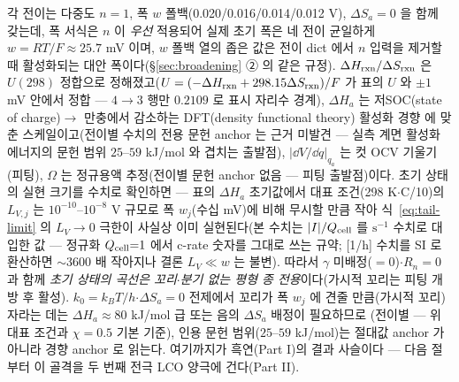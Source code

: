 각 전이는 다중도 $n=1$, 폭 $w$ 폴백(0.020/0.016/0.014/0.012 V), $\Delta S_a=0$ 을 함께 갖는데, 폭
서식은 $n$ 이 \emph{우선} 적용되어 실제 초기 폭은 네 전이 균일하게 $w=RT/F\approx25.7$ mV 이며, $w$
폴백 열의 좁은 값은 전이 dict 에서 $n$ 입력을 제거할 때 활성화되는 대안 폭이다(\S\ref{sec:broadening}
② 의 같은 규정). $\Delta H_{\mathrm{rxn}}/\Delta S_{\mathrm{rxn}}$
은 $U(298)$ 정합으로 정해졌고($U=(-\Delta H_{\mathrm{rxn}}+298.15\Delta S_{\mathrm{rxn}})/F$ 가 표의 $U$ 와 $\pm1$ mV 안에서 정합 --- $4\!\to\!3$ 행만 $0.2109$ 로 표시 자리수 경계), $\Delta H_a$ 는 저SOC(state of charge)$\to$
만충에서 감소하는 DFT(density functional theory) 활성화 경향\cite{persson2010,persson2010b} 에 맞춘
스케일이고(전이별 수치의 전용 문헌 anchor 는 근거 미발견 --- 실측 계면 활성화 에너지의 문헌 범위
$25$--$59$ kJ/mol 와 겹치는 출발점), $|\dd V/\dd q|_{q_a}$ 는 컷 OCV 기울기(피팅), $\Omega$ 는 정규용액
추정(전이별 문헌 anchor 없음 --- 피팅 출발점)이다.
초기 상태의 실현 크기를 수치로 확인하면 --- 표의 $\Delta H_a$ 초기값에서 대표 조건(298 K$\cdot$C/10)의
$L_{V,j}$ 는 $10^{-10}$--$10^{-8}$ V 규모로 폭 $w_j$(수십 mV)에 비해 무시할 만큼 작아 식~\eqref{eq:tail-limit} 의 $L_V\to0$ 극한이 사실상 이미 실현된다(본 수치는 $|I|/Q_{\mathrm{cell}}$ 를 $\mathrm s^{-1}$ 수치로 대입한 값 --- 정규화 $Q_{\mathrm{cell}}{=}1$ 에서 c-rate 숫자를 그대로 쓰는 규약; [1/h] 수치를 SI 로 환산하면 $\sim3600$ 배 작아지나 결론 $L_V\!\ll\!w$ 는 불변). 따라서 $\gamma$ 미배정($=0$)$\cdot$$R_n=0$ 과 함께 \emph{초기 상태의 곡선은 꼬리$\cdot$분기 없는 평형
종 전용}이다(가시적 꼬리는 피팅 개방 후 활성). $k_0=k_BT/h$$\cdot$$\Delta S_a{=}0$ 전제에서 꼬리가
폭 $w_j$ 에 견줄 만큼(가시적 꼬리) 자라는 데는 $\Delta H_a\approx80$ kJ/mol 급 또는 음의 $\Delta S_a$ 배정이 필요하므로
(전이별 --- 위 대표 조건과 $\chi=0.5$ 기본 기준), 인용 문헌
범위($25$--$59$ kJ/mol)는 절대값 anchor 가 아니라 경향 anchor 로 읽는다.
여기까지가 흑연(Part I)의 결과 사슬이다 --- 다음 절부터 이 골격을 두 번째 전극 LCO 양극에 건다(Part II).

